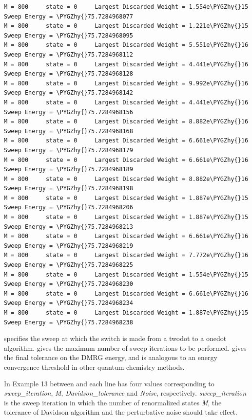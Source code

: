 \documentclass[letterpaper,10pt,english]{sphinxmanual}
\def\PYGZhy{\char`\-}
\begin{document}
\begin{Verbatim}[commandchars=\\\{\}]
M = 800     state = 0     Largest Discarded Weight = 1.554e\PYGZhy{}15  Sweep Energy = \PYGZhy{}75.7284968077
M = 800     state = 0     Largest Discarded Weight = 1.221e\PYGZhy{}15  Sweep Energy = \PYGZhy{}75.7284968095
M = 800     state = 0     Largest Discarded Weight = 5.551e\PYGZhy{}16  Sweep Energy = \PYGZhy{}75.7284968112
M = 800     state = 0     Largest Discarded Weight = 4.441e\PYGZhy{}16  Sweep Energy = \PYGZhy{}75.7284968128
M = 800     state = 0     Largest Discarded Weight = 9.992e\PYGZhy{}16  Sweep Energy = \PYGZhy{}75.7284968142
M = 800     state = 0     Largest Discarded Weight = 4.441e\PYGZhy{}16  Sweep Energy = \PYGZhy{}75.7284968156
M = 800     state = 0     Largest Discarded Weight = 8.882e\PYGZhy{}16  Sweep Energy = \PYGZhy{}75.7284968168
M = 800     state = 0     Largest Discarded Weight = 6.661e\PYGZhy{}16  Sweep Energy = \PYGZhy{}75.7284968179
M = 800     state = 0     Largest Discarded Weight = 6.661e\PYGZhy{}16  Sweep Energy = \PYGZhy{}75.7284968189
M = 800     state = 0     Largest Discarded Weight = 8.882e\PYGZhy{}16  Sweep Energy = \PYGZhy{}75.7284968198
M = 800     state = 0     Largest Discarded Weight = 1.887e\PYGZhy{}15  Sweep Energy = \PYGZhy{}75.7284968206
M = 800     state = 0     Largest Discarded Weight = 1.887e\PYGZhy{}15  Sweep Energy = \PYGZhy{}75.7284968213
M = 800     state = 0     Largest Discarded Weight = 6.661e\PYGZhy{}16  Sweep Energy = \PYGZhy{}75.7284968219
M = 800     state = 0     Largest Discarded Weight = 7.772e\PYGZhy{}16  Sweep Energy = \PYGZhy{}75.7284968225
M = 800     state = 0     Largest Discarded Weight = 1.554e\PYGZhy{}15  Sweep Energy = \PYGZhy{}75.7284968230
M = 800     state = 0     Largest Discarded Weight = 6.661e\PYGZhy{}16  Sweep Energy = \PYGZhy{}75.7284968234
M = 800     state = 0     Largest Discarded Weight = 1.887e\PYGZhy{}15  Sweep Energy = \PYGZhy{}75.7284968238
\end{Verbatim}

 specifies the sweep at which the switch is made
from a twodot to a onedot algorithm.
 gives the maximum number of sweep iterations to be performed.
 gives the final tolerance on the DMRG energy,
and is analogous to an energy convergence threshold in other quantum chemistry methods.

In Example 13 between  and  each line has four values corresponding to \emph{sweep\_iteration},  \emph{M}, \emph{Davidson\_tolerance} and \emph{Noise}, respectively.
\emph{sweep\_iteration} is the sweep iteration in which the number of renormalized states \emph{M},
the tolerance of Davidson algorithm and the perturbative noise should take effect.
\end{document}
